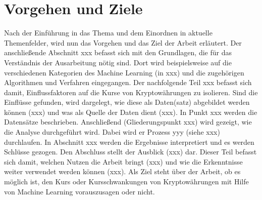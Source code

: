 \chapter{Vorgehen und Ziele}\label{chapter:Vorgehen}
Nach der Einführung in das Thema und dem Einordnen in aktuelle Themenfelder, wird nun das Vorgehen und das Ziel der Arbeit erläutert.\newline
Der anschließende Abschnitt xxx befasst sich mit den Grundlagen, die für das Verständnis der Ausarbeitung nötig sind. Dort wird beispielsweise auf die verschiedenen Kategorien des Machine Learning (in xxx) und die zugehörigen Algorithmen und Verfahren eingegangen. Der nachfolgende Teil xxx befasst sich damit, Einflussfaktoren auf die Kurse von Kryptowährungen zu isolieren. Sind die Einflüsse gefunden, wird dargelegt, wie diese als Daten(satz) abgebildet werden können (xxx) und was als Quelle der Daten dient (xxx). In Punkt xxx werden die Datensätze beschrieben. Anschließend (Gliederungspunkt xxx) wird gezeigt, wie die Analyse durchgeführt wird. Dabei wird er Prozess yyy (siehe xxx)  durchlaufen. In Abschnitt xxx werden die Ergebnisse interpretiert und es werden Schlüsse gezogen.  Den Abschluss stellt der Ausblick (xxx) dar. Dieser Teil befasst sich damit, welchen Nutzen die Arbeit bringt (xxx) und wie die Erkenntnisse weiter verwendet werden können (xxx).\newline
{} \newline
{}\newline
Als Ziel steht über der Arbeit, ob es möglich ist, den Kurs oder Kursschwankungen von Kryptowährungen mit Hilfe von Machine Learning vorauszusagen oder nicht. \newline
{}
